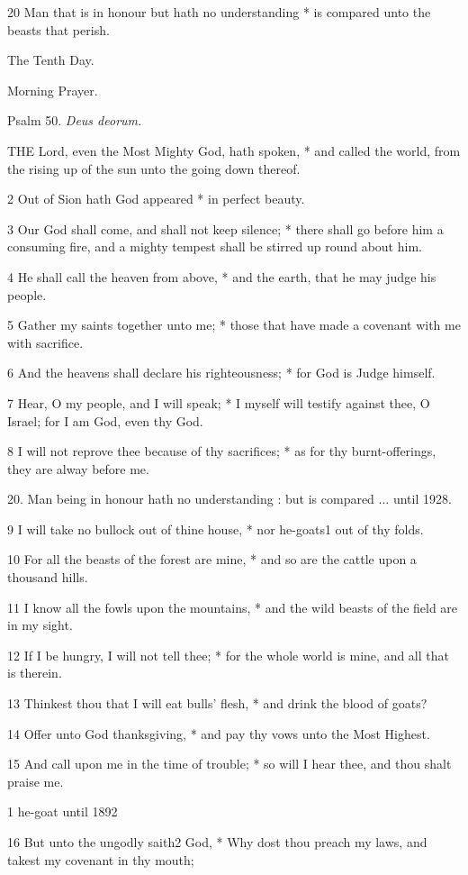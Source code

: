 20 Man that is in honour but hath no understanding
* is compared unto the beasts that perish.

The
Tenth Day.

Morning
Prayer.

Psalm
50. \emph{Deus deorum.}

THE
Lord, even the Most Mighty God, hath spoken, * and called the world, from
the rising up of the sun unto the going down thereof.

2 Out of Sion hath God appeared * in perfect beauty.

3 Our God shall come, and shall not keep silence; *
there shall go before him a consuming fire, and a mighty tempest shall
be stirred up round about him.

4 He shall call the heaven from above, * and the earth,
that he may judge his people.

5 Gather my saints together unto me; * those that have
made a covenant with me with sacrifice.

6 And the heavens shall declare his righteousness;
* for God is Judge himself.

7 Hear, O my people, and I will speak; * I myself will
testify against thee, O Israel; for I am God, even thy God.

8 I will not reprove thee because of thy sacrifices;
* as for thy burnt-offerings, they are alway before me.

20. Man being in honour hath
no understanding : but is compared ...
until 1928.

9 I will take no bullock out of thine house, * nor he-goats1
out of thy folds.

10 For all the beasts of the forest are mine, * and so
are the cattle upon a thousand hills.

11 I know all the fowls upon the mountains, * and the
wild beasts of the field are in my sight.

12 If I be hungry, I will not tell thee; * for the whole
world is mine, and all that is therein.

13 Thinkest thou that I will eat bulls' flesh, * and
drink the blood of goats?

14 Offer unto God thanksgiving, * and pay thy vows unto
the Most Highest.

15 And call upon me in the time of trouble; * so will
I hear thee, and thou shalt praise me. 

1 he-goat
until 1892

16 But unto the ungodly saith2 God, * Why
dost thou preach my laws, and takest my covenant in thy mouth;

